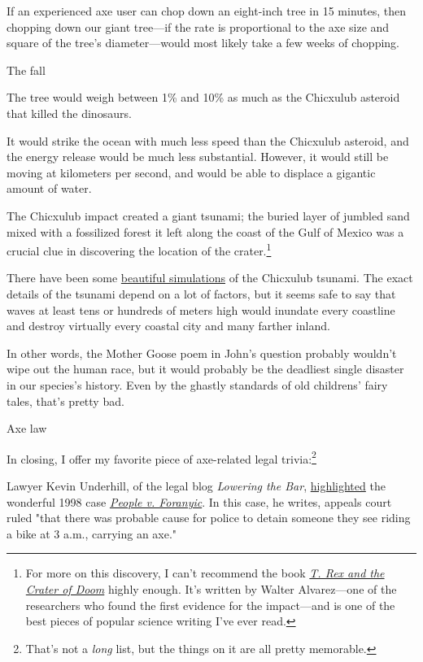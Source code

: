 {{If an experienced axe user can chop down an eight-inch tree in 15 minutes, then chopping down our giant tree—if the rate is proportional to the axe size and square of the tree's diameter—would most likely take a few weeks of chopping.}

{The fall}

{The tree would weigh between 1\% and 10\% as much as the Chicxulub asteroid that killed the dinosaurs.}

{It would strike the ocean with much less speed than the Chicxulub asteroid, and the energy release would be much less substantial. However, it would still be moving at kilometers per second, and would be able to displace a gigantic amount of water.}

{The Chicxulub impact created a giant tsunami; the buried layer of jumbled sand mixed with a fossilized forest it left along the coast of the Gulf of Mexico was a crucial clue in discovering the location of the crater.{\footnote{For more on this discovery, I can't recommend the book \emph{ \href{http://www.amazon.com/Crater-Doom-Princeton-Science-Library-ebook/dp/B00BMVRBLC/ref=sr\_sp-atf\_title\_1\_1?s=books&ie=UTF8&qid=1396542141&sr=1-1&keywords=t+rex+and+the+crater+of+doom}{T. Rex and the Crater of Doom}} highly enough. It's written by Walter Alvarez—one of the researchers who found the first evidence for the impact—and is one of the best pieces of popular science writing I've ever read.} } }

{There have been some \href{https://www.youtube.com/watch?v=Dcp0JhwNgmE}{beautiful simulations} of the Chicxulub tsunami. The exact details of the tsunami depend on a lot of factors, but it seems safe to say that waves at least tens or hundreds of meters high would inundate every coastline and destroy virtually every coastal city and many farther inland.}

{In other words, the Mother Goose poem in John's question probably wouldn't wipe out the human race, but it would probably be the deadliest single disaster in our species's history. Even by the ghastly standards of old childrens' fairy tales, that's pretty bad.}

{Axe law}

{In closing, I offer my favorite piece of axe-related legal trivia:{\footnote{That's not a \emph{long} list, but the things on it are all pretty memorable.} } }

{Lawyer Kevin Underhill, of the legal blog \emph{Lowering the Bar}, \href{http://kevinunderhill.typepad.com/lowering\_the\_bar/case-law-hall-of-fame.html}{highlighted} the wonderful 1998 case \emph{ \href{http://kevinunderhill.typepad.com/Documents/Opinions/People\_v\_Foranyic.pdf} {People v. Foranyic}}. In this case, he writes, appeals court ruled "that there was probable cause for police to detain someone they see riding a bike at 3 a.m., carrying an axe."}

}
